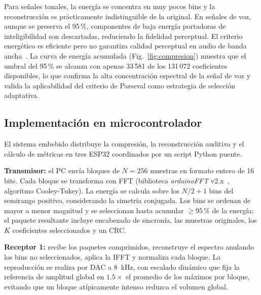 \documentclass[12pt, journal]{IEEEtran}
\begin{document}
\begin{table}[H]
\centering
\caption{Métricas de calidad de reconstrucción para dos tipos de señal}
\label{tab:metricas_comp}
\end{table}

Para señales tonales, la energía se concentra en muy pocos bins y la
reconstrucción es prácticamente indistinguible de la original. En señales de
voz, aunque se preserva el 95\,\%, componentes de baja energía portadoras de
inteligibilidad son descartadas, reduciendo la fidelidad perceptual. El criterio
energético es eficiente pero no garantiza calidad perceptual en audio de banda
ancha~\cite{proakis2007digital}. La curva de energía acumulada (Fig.~\ref{fig:compresion})
muestra que el umbral del 95\,\% se alcanza con apenas 33\,581 de los 131\,072
coeficientes disponibles, lo que confirma la alta concentración espectral de la
señal de voz y valida la aplicabilidad del criterio de Parseval como estrategia
de selección adaptativa.

\subsection{Implementación en microcontrolador}

El sistema embebido distribuye la compresión, la reconstrucción auditiva y el
cálculo de métricas en tres ESP32 coordinados por un script Python puente.

\textbf{Transmisor:} el PC envía bloques de $N{=}256$ muestras en formato entero
de 16 bits. Cada bloque se transforma con FFT (biblioteca \emph{arduinoFFT}
v2.x~\cite{arduinoFFT}, algoritmo Cooley-Tukey). La energía se calcula sobre los
$N/2{+}1$ bins del semirango positivo, considerando la simetría conjugada. Los
bins se ordenan de mayor a menor magnitud y se seleccionan hasta acumular
$\geq 95\,\%$ de la energía; el paquete resultante incluye encabezado de
sincronía, las muestras originales, los $K$ coeficientes seleccionados y un CRC.

\textbf{Receptor 1:} recibe los paquetes comprimidos, reconstruye el espectro
anulando los bins no seleccionados, aplica la IFFT y normaliza cada bloque. La
reproducción se realiza por DAC a 8~kHz, con escalado dinámico que fija la
referencia de amplitud global en $1.5\times$ el promedio de los máximos por
bloque, evitando que un bloque atípicamente intenso reduzca el volumen global.
\end{document}
